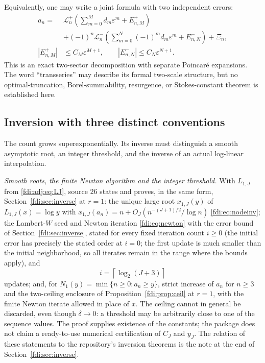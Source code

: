 \documentclass[11pt,letterpaper]{article}
\theoremstyle{remark}\newtheorem{remark}[theorem]{Remark}
\newcommand{\eps}{\varepsilon}\newcommand{\Pois}{\operatorname{Poisson}}
\newcommand{\ceil}[1]{\left\lceil #1\right\rceil}
\begin{document}
Equivalently, one may write a joint formula with two independent errors:
\begin{align*}
 a_n={}&\mathcal L_n^+\left(\sum_{m=0}^Md_m\eps^m+E_{n,M}^+\right)\\
 &+(-1)^n\mathcal L_n^-\left(\sum_{m=0}^N(-1)^md_m\eps^m+E_{n,N}^-\right)+\Xi_n,\\
 |E_{n,M}^+|&\le C_M\eps^{M+1},\qquad |E_{n,N}^-|\le C_N\eps^{N+1}.
\end{align*}
This is an exact two-sector decomposition with separate Poincar\'e expansions. The word ``transseries'' may describe its formal two-scale structure, but no optimal-truncation, Borel-summability, resurgence, or Stokes-constant theorem is established here.

\subsection{Inversion with three distinct conventions}\label{fdi:adj:sec:inverse}
The count grows superexponentially. Its inverse must distinguish a smooth asymptotic root, an integer threshold, and the inverse of an actual log-linear interpolation.

\emph{Smooth roots, the finite Newton algorithm and the integer threshold.} With $L_{1,J}$ from \eqref{fdi:adj:eq:LJ}, source 26 states and proves, in the same form, Section~\ref{fdi:sec:inverse} at $r=1$: the unique large root $x_{1,J}(y)$ of $L_{1,J}(x)=\log y$ with $x_{1,J}(a_n)=n+O_J(n^{-(J+1)/2}/\log n)$ \eqref{fdi:eq:nodeinv}; the Lambert-$W$ seed and Newton iteration \eqref{fdi:eq:newton} with the error bound of Section~\ref{fdi:sec:inverse}, stated for every fixed iteration count $i\ge0$ (the initial error has precisely the stated order at $i=0$; the first update is much smaller than the initial neighborhood, so all iterates remain in the range where the bounds apply), and
\begin{equation}\label{fdi:adj:eq:steps}
 i=\ceil{\log_2(J+3)}
\end{equation}
updates; and, for $N_1(y)=\min\{n\ge0:a_n\ge y\}$, strict increase of $a_n$ for $n\ge3$ and the two-ceiling enclosure of Proposition~\ref{fdi:prop:ceil} at $r=1$, with the finite Newton iterate allowed in place of $x$. The ceiling cannot in general be discarded, even though $\delta\to0$: a threshold may be arbitrarily close to one of the sequence values. The proof supplies existence of the constants; the package does not claim a ready-to-use numerical certification of $C_J$ and $y_J$. The relation of these statements to the repository's inversion theorems is the note at the end of Section~\ref{fdi:sec:inverse}.
\end{document}
